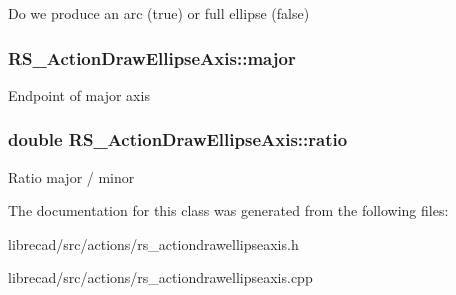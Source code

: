 Do we produce an arc (true) or full ellipse (false) \hypertarget{classRS__ActionDrawEllipseAxis_ae736862026b1e6a4b8441967c99ee33c}{
\subsubsection[{major}]{ R\-S\-\_\-\-Action\-Draw\-Ellipse\-Axis\-::major\hspace{0.3cm}{\ttfamily [protected]}}}\label{classRS__ActionDrawEllipseAxis_ae736862026b1e6a4b8441967c99ee33c}
Endpoint of major axis \hypertarget{classRS__ActionDrawEllipseAxis_a96b61e75a170b49e54442e24edd71b49}{
\subsubsection[{ratio}]{\setlength{\rightskip}{0pt plus 5cm}double R\-S\-\_\-\-Action\-Draw\-Ellipse\-Axis\-::ratio\hspace{0.3cm}{\ttfamily [protected]}}}\label{classRS__ActionDrawEllipseAxis_a96b61e75a170b49e54442e24edd71b49}
Ratio major / minor 

The documentation for this class was generated from the following files\-:\begin{DoxyCompactItemize}
\item 
librecad/src/actions/rs\-\_\-actiondrawellipseaxis.\-h\item 
librecad/src/actions/rs\-\_\-actiondrawellipseaxis.\-cpp\end{DoxyCompactItemize}
